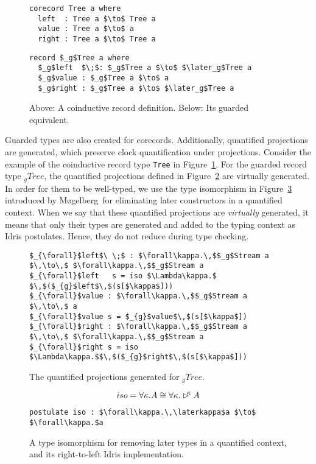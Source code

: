 \begin{figure}[h]
\begin{lstlisting}[mathescape,title=\idrisBlock]
corecord Tree a where
  left  : Tree a $\to$ Tree a
  value : Tree a $\to$ a
  right : Tree a $\to$ Tree a
\end{lstlisting}
\begin{lstlisting}[mathescape,title=\idrisBlock]
record $_g$Tree a where
  $_g$left  $\;$: $_g$Tree a $\to$ $\later_g$Tree a
  $_g$value : $_g$Tree a $\to$ a
  $_g$right : $_g$Tree a $\to$ $\later_g$Tree a
\end{lstlisting}
  \caption{Above: A coinductive record definition. Below: Its guarded equivalent.}
  \label{fig:guarded_tree_inf}
\end{figure}

Guarded types are also created for corecords. Additionally, quantified
projections are generated, which preserve clock quantification under
projections. Consider the example of the coinductive record type \texttt{Tree}
in Figure~\ref{fig:guarded_tree_inf}. For the guarded record type $_{g}Tree$, the
quantified projections defined in Figure~\ref{fig:tree_quantified_projections}
are virtually generated. In order for them to be well-typed, we use the type
isomorphism in Figure~\ref{fig:quantified_later_iso} introduced by
Møgelberg\,\citep{Mogelberg:2014} for eliminating later constructors in a
quantified context. When we say that these quantified projections are
\emph{virtually} generated, it means that only their types are generated and
added to the typing context as Idris postulates. Hence, they do not reduce
during type checking. 

\begin{figure}[h]
\begin{lstlisting}[mathescape,title=\idrisBlock]
$_{\forall}$left$\ \;$ : $\forall\kappa.\,$$_g$Stream a $\,\to\,$ $\forall\kappa.\,$$_g$Stream a
$_{\forall}$left   s = iso $\Lambda\kappa.$ $\,$($_{g}$left$\,$(s[$\kappa$]))
$_{\forall}$value : $\forall\kappa.\,$$_g$Stream a $\,\to\,$ a
$_{\forall}$value s = $_{g}$value$\,$(s[$\kappa$])
$_{\forall}$right : $\forall\kappa.\,$$_g$Stream a $\,\to\,$ $\forall\kappa.\,$$_g$Stream a
$_{\forall}$right s = iso $\Lambda\kappa.$$\,$($_{g}$right$\,$(s[$\kappa$]))
\end{lstlisting}
  \caption{The quantified projections generated for $_{g}Tree$.}
\label{fig:tree_quantified_projections}
\end{figure}

\begin{figure}[h]
\[
iso = \forall \kappa .A\cong \forall\kappa.\rhd^{\!\!\kappa} A
\]
\begin{lstlisting}[mathescape,title=\idrisBlock]
postulate iso : $\forall\kappa.\,\laterkappa$a $\to$ $\forall\kappa.$a
\end{lstlisting}
  \caption{A type isomorphism for removing later types in a quantified context, and
    its right-to-left Idris implementation.}
\label{fig:quantified_later_iso}
\end{figure}

